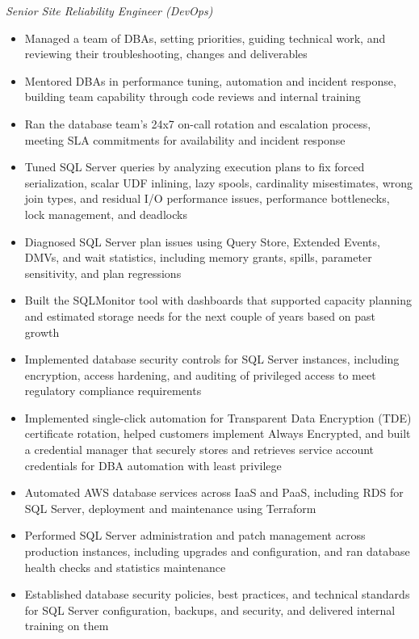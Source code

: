 \documentclass[10pt,a4paper]{article}
\begin{document}
\textit{Senior Site Reliability Engineer (DevOps)}\\[-5pt]
\begin{itemize}
  \item Managed a team of DBAs, setting priorities, guiding technical work, and reviewing their troubleshooting, changes and deliverables
  \item Mentored DBAs in performance tuning, automation and incident response, building team capability through code reviews and internal training
  \item Ran the database team's 24x7 on-call rotation and escalation process, meeting SLA commitments for availability and incident response
  \item Tuned SQL Server queries by analyzing execution plans to fix forced serialization, scalar UDF inlining, lazy spools, cardinality misestimates, wrong join types, and residual I/O performance issues, performance bottlenecks, lock management, and deadlocks
  \item Diagnosed SQL Server plan issues using Query Store, Extended Events, DMVs, and wait statistics, including memory grants, spills, parameter sensitivity, and plan regressions
  \item Built the SQLMonitor tool with dashboards that supported capacity planning and estimated storage needs for the next couple of years based on past growth
  \item Implemented database security controls for SQL Server instances, including encryption, access hardening, and auditing of privileged access to meet regulatory compliance requirements
  \item Implemented single-click automation for Transparent Data Encryption (TDE) certificate rotation, helped customers implement Always Encrypted, and built a credential manager that securely stores and retrieves service account credentials for DBA automation with least privilege
  \item Automated AWS database services across IaaS and PaaS, including RDS for SQL Server, deployment and maintenance using Terraform
  \item Performed SQL Server administration and patch management across production instances, including upgrades and configuration, and ran database health checks and statistics maintenance
  \item Established database security policies, best practices, and technical standards for SQL Server configuration, backups, and security, and delivered internal training on them

\end{itemize}
\end{document}
